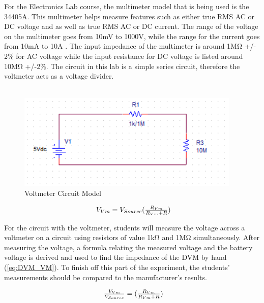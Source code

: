 For the Electronics Lab course, the multimeter model that is being used is the 34405A. This multimeter helps measure features such as either true RMS AC or DC voltage and as well as true RMS AC or DC current. The range of the voltage on the multimeter goes from 10mV to 1000V, while the range for the current goes from 10mA to 10A \cite{34405A:3}. The input impedance of the multimeter is around 1M\si{\ohm} +/- 2\% for AC voltage while the input resistance for DC voltage is listed around 10M\si{\ohm} +/-2\%\cite{34405A:6}. The circuit in this lab is a simple series circuit, therefore the voltmeter acts as a voltage divider.\\
\\

\begin{figure}[h!]
\centering
\includegraphics{voltmeterfinal.PNG}
\caption{Voltmeter Circuit Model}
\label{fig:Voltmeter_Pic}
\end{figure}

\begin{equation}
\label{eq:volt_div}
\centerline{ $ V_{Vm} = V_{Source}(\frac{R_{Vm}}{R_{Vm} + R}) $} 
\end{equation}

For the circuit with the voltmeter, students will measure the  voltage across a voltmeter on a circuit using resistors of value 1kΩ and 1MΩ simultaneously. After measuring the voltage, a formula relating the measured voltage and the battery voltage is derived and used to find the impedance of the DVM by hand (\ref{eq:DVM_VM}). To finish off this part of the experiment, the students’ measurements should be compared to the manufacturer's results. 

\begin{equation}
\label{eq:DVM_VM}
\centerline{ $ \frac{V_{Vm}}{V_{Source}} = (\frac{R_{Vm}}{R_{Vm} + R}) $} 
\end{equation}

